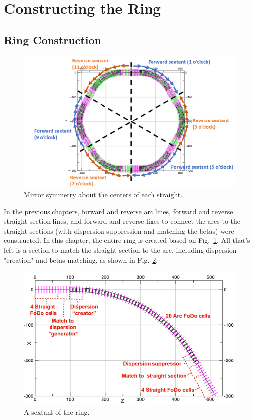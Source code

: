 \documentclass{hitec}     %
\begin{document}
{\section{Constructing the Ring}
\label{s:ring}

\subsection{Ring Construction}

\begin{figure}[h!]
  \includegraphics*[width=\columnwidth]{figures/ring}
  \caption{\label{f:ring}Mirror symmetry about the centers of each straight.}
\end{figure}

In the previous chapters, 
forward and reverse arc lines, forward and reverse straight section lines, 
and forward and reverse lines to connect the arcs to the straight sections 
(with dispersion suppression and matching the betas) were constructed. 
In this chapter, the entire ring is created based on Fig.~\ref{f:ring}. 
All that's left is a section to match the straight section to the arc, including dispersion "creation" and betas matching, as shown in Fig.~\ref{f:sextant}.
\begin{figure}[!h]
  \centering
  \includegraphics[width=0.8\linewidth]{figures/sextant.pdf}
  \caption{A sextant of the ring.}
  \label{f:sextant}
\end{figure}

}
\end{document}
